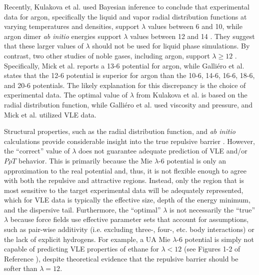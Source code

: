 \documentclass[preprint,letterpaper,floatfix,citeautoscript,aip,jcp]{revtex4-1}
\begin{document}
Recently, Kulakova et al. used Bayesian inference to conclude that experimental data for argon, specifically the liquid and vapor radial distribution functions at varying temperatures and densities, support $\lambda$ values between 6 and 10, while argon dimer \textit{ab initio} energies support $\lambda$ values between 12 and 14 \cite{Kulakova2017}. They suggest that these larger values of $\lambda$ should not be used for liquid phase simulations. By contrast, two other studies of noble gases, including argon, support $\lambda \ge 12$ \cite{Galliero2005,Mick_Mie}. Specifically, Mick et al. reports a 13-6 potential for argon, while Galli{\'e}ro et al. states that the 12-6 potential is superior for argon than the 10-6, 14-6, 16-6, 18-6, and 20-6 potentials. The likely explanation for this discrepancy is the choice of experimental data. The optimal value of $\lambda$ from Kulakova et al. is based on the radial distribution function, while Galli{\'e}ro et al. used viscosity and pressure, and Mick et al. utilized VLE data.

Structural properties, such as the radial distribution function, and \textit{ab initio} calculations provide considerable insight into the true repulsive barrier \cite{Kulakova2017,Galliero2005}. However, the ``correct'' value of $\lambda$ does not guarantee adequate prediction of VLE and/or $P \rho T$ behavior. This is primarily because the Mie $\lambda$-6 potential is only an approximation to the real potential and, thus, it is not flexible enough to agree with both the repulsive and attractive regions. Instead, only the region that is most sensitive to the target experimental data will be adequately represented, which for VLE data is typically the 
effective size, depth of the energy minimum, and the dispersive tail. Furthermore, the ``optimal'' $\lambda$ is not necessarily the ``true'' $\lambda$ because force fields use effective parameter sets that account for assumptions, such as pair-wise additivity (i.e. excluding three-, four-, etc. body interactions) or the lack of explicit hydrogens. For example, a UA Mie $\lambda$-6 potential is simply not capable of predicting VLE properties of ethane for $\lambda < 12$ (see Figures 1-2 of Reference ), despite theoretical evidence that the repulsive barrier should be softer than $\lambda = 12$.

\end{document}

